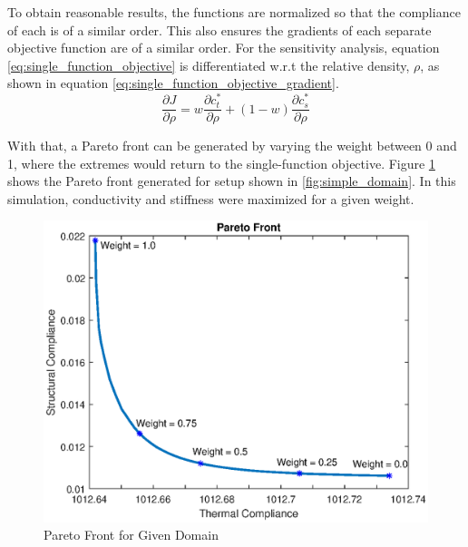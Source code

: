 To obtain reasonable results, the functions are normalized so that the compliance of each is of a similar order. This also ensures the gradients of each separate objective function are of a similar order. For the sensitivity analysis, equation \ref{eq:single_function_objective} is differentiated w.r.t the relative density, $\rho$, as shown in equation \ref{eq:single_function_objective_gradient}.
\begin{equation}
    \frac{\partial J}{\partial\rho} = w\frac{\partial c^*_t}{\partial\rho} + (1-w)\frac{\partial c^*_s}{\partial\rho}
    \label{eq:single_function_objective_gradient}
\end{equation}

With that, a Pareto front can be generated by varying the weight between 0 and 1, where the extremes would return to the single-function objective. Figure \ref{fig:mf_pareto_front_simple_domain} shows the Pareto front generated for setup shown in \ref{fig:simple_domain}. In this simulation, conductivity and stiffness were maximized for a given weight.
\begin{figure}[ht]
    \centering
    \includegraphics[width=0.6\linewidth]{figures/chapter_5/ParetoFrontForGivenStructures.eps}
    \caption{Pareto Front for Given Domain}
    \label{fig:mf_pareto_front_simple_domain}
\end{figure}

